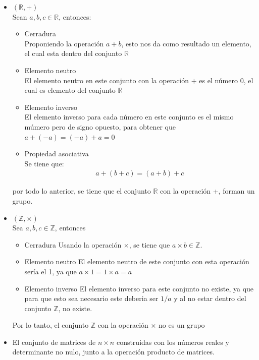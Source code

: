 \documentclass[12pt,letterpaper]{report}
\begin{document}
\begin{itemize}
    \item $(\mathbb{R},+)$\\
    Sean $a,b,c \in \mathbb{R}$, entonces:
    \begin{itemize}
        \item Cerradura\\
        Proponiendo la operación $a+b$, esto nos da como resultado un elemento, el cual esta dentro del conjunto $\mathbb{R}$
        \item Elemento neutro\\
        El elemento neutro en este conjunto con la operación $+$ es el número 0, el cual es elemento del conjunto $\mathbb{R}$
        \item Elemento inverso\\
        El elemento inverso para cada número en este conjunto es el mismo múmero pero de signo opuesto, para obtener que $a+(-a)=(-a)+a=0$
        \item Propiedad asociativa\\
        Se tiene que:
        \begin{align*}
            a+(b+c)=(a+b)+c
        \end{align*}
    \end{itemize}
    por todo lo anterior, se tiene que el conjunto $\mathbb{R}$ con la operación +, forman un grupo.
    \item $(\mathbb{Z},\times)$\\
    Sea $a,b,c \in \mathbb{Z}$, entonces
    \begin{itemize}
        \item Cerradura
        Usando la operación $\times$, se tiene que $a\times b \in \mathbb{Z}$.
        \item Elemento neutro
        El elemento neutro de este conjunto con esta operación sería el 1, ya que $a\times 1 = 1\times a = a$
        \item Elemento inverso
        El elemento inverso para este conjunto no existe, ya que para que esto sea necesario este deberia ser $1/a$ y al no estar dentro del conjunto $\mathbb{Z}$, no existe.
    \end{itemize}
    Por lo tanto, el conjunto $\mathbb{Z}$ con la operación $\times$ no es un grupo
    \item El conjunto de matrices de $n\times n$ construidas con los números reales y determinante no nulo, junto a la operación producto de matrices.\\

\end{itemize}
\end{document}
